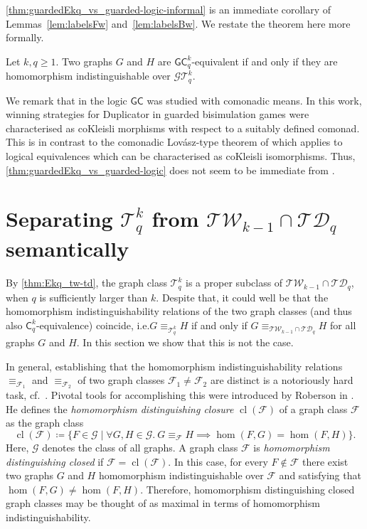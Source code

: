 \documentclass{lmcs}
\theoremstyle{plain}\newtheorem{claim}[thm]{Claim}   %
\newcommand{\cG}{\ensuremath{\mathcal G}}
\newcommand{\cT}{\ensuremath{\mathcal T}}
\newcommand{\Ekq}{\ensuremath{\cT_{q}^{k}}}
\newcommand{\GEkqLL}{\ensuremath{\cG\Ekq}}
\newcommand{\lGC}{\ensuremath{\mathsf{GC}}}
\DeclareMathOperator{\cl}{cl}
\begin{document}
\autoref{thm:guardedEkq_vs_guarded-logic-informal} is an immediate corollary of Lemmas~\ref{lem:labelsFw} and~\ref{lem:labelsBw}.
We restate the theorem here more formally.

\begin{thm}
	\label{thm:guardedEkq_vs_guarded-logic}
	Let $k, q \geq 1$.
	Two graphs $G$ and $H$ are $\lGC^k_q$-equivalent
	if and only if 
	they are homomorphism indistinguishable over $\GEkqLL$.
\end{thm}

We remark that in \cite{Abramsky_comonadic_2021} the logic $\lGC$ was studied with comonadic means.
In this work, winning strategies for Duplicator in guarded bisimulation games were characterised as coKleisli morphisms with respect to a suitably defined comonad.
This is in contrast to the comonadic Lov\'asz-type theorem of \cite{dawar_lovasz-type_2021} which applies to logical equivalences which can be characterised as coKleisli isomorphisms.
Thus, \autoref{thm:guardedEkq_vs_guarded-logic} does not seem to be immediate from \cite{Abramsky_comonadic_2021,dawar_lovasz-type_2021}.

\section{Separating \texorpdfstring{$\Ekq$}{Ekq} from \texorpdfstring{$\mathcal{TW}_{k-1} \cap \mathcal{TD}_q$}{TWk-1 intersection TDq} semantically}
\label{sec:separation-sem}

By \autoref{thm:Ekq_tw-td}, the graph class $\Ekq$ is a proper subclass of $\mathcal{TW}_{k-1} \cap \mathcal{TD}_q$, when $q$ is sufficiently larger than $k$.
Despite that, it could well be that the homomorphism indistinguishability relations of the two graph classes (and thus also $\mathsf{C}^k_q$-equivalence) coincide, i.e.\@ $G \equiv_{\Ekq} H$ if and only if $G \equiv_{\mathcal{TW}_{k-1} \cap \mathcal{TD}_q} H$ for all graphs $G$ and $H$.
In this section we show that this is not the case.

\corSemantic*

In general, establishing that the homomorphism indistinguishability relations $\equiv_{\mathcal{F}_1}$ and $\equiv_{\mathcal{F}_2}$ of two graph classes $\mathcal{F}_1 \neq \mathcal{F}_2$ are distinct is a notoriously hard task, cf.\ \cite[Chapter~6]{seppelt_homomorphism_2024}.
Pivotal tools for accomplishing this were introduced by Roberson in \cite{roberson_oddomorphisms_2022}.
He defines the \emph{homomorphism distinguishing closure} $\cl(\mathcal{F})$ of a graph class $\mathcal{F}$ as the graph class
\[
\cl(\mathcal{F}) \coloneqq \{ F \in \mathcal{G} \mid \forall G, H\in \mathcal{G} .\ G \equiv_{\mathcal{F}} H \implies \hom(F, G) = \hom(F, H)\}.
\]
Here, $\mathcal{G}$ denotes the class of all graphs.
A graph class $\mathcal{F}$ is \emph{homomorphism distinguishing closed} if $\mathcal{F} = \cl(\mathcal{F})$.
In this case, for every $F \not\in \mathcal{F}$ there exist two graphs $G$ and $H$ homomorphism indistinguishable over $\mathcal{F}$ and satisfying that $\hom(F, G) \neq \hom(F, H)$.
Therefore, homomorphism distinguishing closed graph classes may be thought of as maximal in terms of homomorphism indistinguishability.
\end{document}

